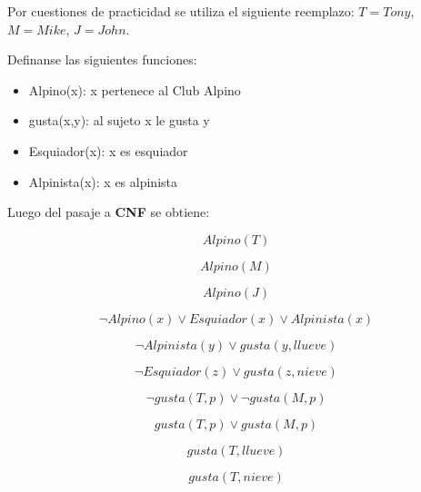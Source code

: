 \documentclass[12pt]{article} %
\begin{document}
\par Por cuestiones de practicidad se utiliza el siguiente reemplazo: $T=Tony$, $M=Mike$, $J=John$.\\

\par Definanse las siguientes funciones:

\begin{itemize}
\item Alpino(x): x pertenece al Club Alpino
\item gusta(x,y): al sujeto x le gusta y
\item Esquiador(x): x es esquiador
\item Alpinista(x): x es alpinista
\end{itemize}
\par Luego del pasaje a \textbf{CNF} se obtiene:

\begin{equation}
Alpino(T)
\end{equation}

\begin{equation}
Alpino(M)
\end{equation}

\begin{equation}
Alpino(J)
\end{equation}

\begin{equation}
\neg Alpino(x) \vee Esquiador(x) \vee Alpinista(x)
\end{equation}

\begin{equation}
\neg Alpinista(y) \vee gusta(y,llueve)
\end{equation}

\begin{equation}
\neg Esquiador(z) \vee gusta(z, nieve)
\end{equation}

\begin{equation}
\neg gusta(T,p) \vee \neg gusta(M, p)
\end{equation}

\begin{equation}
gusta(T,p) \vee gusta(M,p)
\end{equation}

\begin{equation}
gusta(T,llueve)
\end{equation}

\begin{equation}
gusta(T, nieve)
\end{equation}
\end{document}
